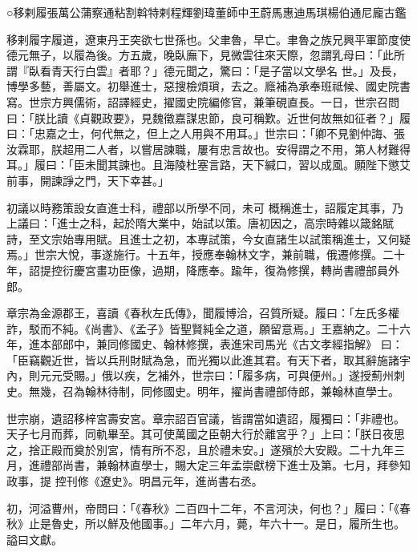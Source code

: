 
\begin{pinyinscope}

 ○移剌履張萬公蒲察通粘割斡特剌程輝劉瑋董師中王蔚馬惠迪馬琪楊伯通尼龐古鑑



 移剌履字履道，遼東丹王突欲七世孫也。父聿魯，早亡。聿魯之族兄興平軍節度使德元無子，以履為後。方五歲，晚臥廡下，見微雲往來天際，忽謂乳母曰：「此所謂『臥看青天行白雲』者耶？」德元聞之，驚曰：「是子當以文學名
 世。」及長，博學多藝，善屬文。初舉進士，惡搜檢煩瑣，去之。廕補為承奉班祗候、國史院書寫。世宗方興儒術，詔譯經史，擢國史院編修官，兼筆硯直長。一日，世宗召問曰：「朕比讀《貞觀政要》，見魏徵嘉謀忠節，良可稱歎。近世何故無如征者？」履曰：「忠嘉之士，何代無之，但上之人用與不用耳。」世宗曰：「卿不見劉仲誨、張汝霖耶，朕超用二人者，以嘗居諫職，屢有忠言故也。安得謂之不用，第人材難得耳。」履曰：「臣未聞其諫也。且海陵杜塞言路，天下緘口，習以成風。願陛下懲艾前事，開諫諍之門，天下幸甚。」



 初議以時務策設女直進士科，禮部以所學不同，未可
 概稱進士，詔履定其事，乃上議曰：「進士之科，起於隋大業中，始試以策。唐初因之，高宗時雜以箴銘賦詩，至文宗始專用賦。且進士之初，本專試策，今女直諸生以試策稱進士，又何疑焉。」世宗大悅，事遂施行。十五年，授應奉翰林文字，兼前職，俄遷修撰。二十年，詔提控衍慶宮畫功臣像，過期，降應奉。踰年，復為修撰，轉尚書禮部員外郎。



 章宗為金源郡王，喜讀《春秋左氏傳》，聞履博洽，召質所疑。履曰：「左氏多權詐，駁而不純。《尚書》、《孟子》皆聖賢純全之道，願留意焉。」王嘉納之。二十六年，進本部郎中，兼同修國史、翰林修撰，表進宋司馬光《古文孝經指解》
 曰：「臣竊觀近世，皆以兵刑財賦為急，而光獨以此進其君。有天下者，取其辭施諸宇內，則元元受賜。」俄以疾，乞補外，世宗曰：「履多病，可與便州。」遂授薊州刺史。無幾，召為翰林待制，同修國史。明年，擢尚書禮部侍郎，兼翰林直學士。



 世宗崩，遺詔移梓宮壽安宮。章宗詔百官議，皆謂當如遺詔，履獨曰：「非禮也。天子七月而葬，同軌畢至。其可使萬國之臣朝大行於離宮乎？」上曰：「朕日夜思之，捨正殿而奠於別宮，情有所不忍，且於禮未安。」遂殯於大安殿。二十九年三月，進禮部尚書，兼翰林直學士，賜大定三年孟崇獻榜下進士及第。七月，拜參知政事，提
 控刊修《遼史》。明昌元年，進尚書右丞。



 初，河溢曹州，帝問曰：「《春秋》二百四十二年，不言河決，何也？」履曰：「《春秋》止是魯史，所以鮮及他國事。」二年六月，薨，年六十一。是日，履所生也。謚曰文獻。




\end{pinyinscope}
